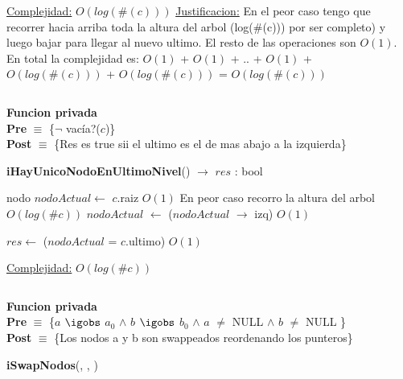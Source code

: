\begin{Algoritmos}
\begin{algorithm}[H]
\begin{algorithmic}[1]
    \medskip
    \Statex \underline{Complejidad:} $O(log(\#(c)))$
    \Statex \underline{Justificacion:} En el peor caso tengo que recorrer hacia arriba toda la altura del arbol (log($\#$(c))) por ser completo) y luego bajar para llegar al nuevo ultimo. El resto de las operaciones son $O(1)$. En total la complejidad es: $O(1)$ + $O(1)$ + .. + $O(1)$ + $O(log(\#(c)))$ + $O(log(\#(c)))$ = $O(log(\#(c)))$
\end{algorithmic}
\end{algorithm}

$ $\newline



\textbf{Funcion privada}\\
\textbf{Pre} $\equiv$ \{$\neg$ vac\'ia?($c$)\}\\%
\textbf{Post} $\equiv$ \{Res es true sii el ultimo es el de mas abajo a la izquierda\}%
\begin{algorithm}[H]
{\textbf{iHayUnicoNodoEnUltimoNivel}() $\to$ $res$ : bool}
\begin{algorithmic}[1]

    \State nodo $nodoActual \gets$ $c$.raiz \Comment $O(1)$
     \Comment En peor caso recorro la altura del arbol $O(log(\#c))$
        \State $nodoActual$ $\gets$ ($nodoActual$ $\rightarrow$ izq) \Comment $O(1)$
    \EndWhile

    \State $res \gets$ ($nodoActual$ = $c$.ultimo) \Comment $O(1)$

    \medskip
    \Statex \underline{Complejidad:} $O(log(\#c))$
\end{algorithmic}
\end{algorithm}



$ $\newline

\textbf{Funcion privada}\\
\textbf{Pre} $\equiv$ \{$a$ $\igobs$ $a_0$ $\land$ $b$ $\igobs$ $b_0$ $\land$ $a$ $\neq$ NULL $\land$ $b$ $\neq$ NULL \}\\%
\textbf{Post} $\equiv$ \{Los nodos a y b son swappeados reordenando los punteros\}%
\begin{algorithm}[H]
{\textbf{iSwapNodos}(, , )}
\begin{algorithmic}[1]


\end{algorithmic}
\end{algorithm}
\end{Algoritmos}
